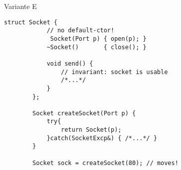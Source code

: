 \begin{frame}[t, fragile]{ Variante E }
	\begin{lstlisting}[basicstyle=\scriptsize]
		struct Socket {
			// no default-ctor!
			 Socket(Port p) { open(p); }
			~Socket()       { close(); }
			
			void send() {
				// invariant: socket is usable
				/*...*/
			}
		};
		
		Socket createSocket(Port p) {
			try{
				return Socket(p);
			}catch(SocketExcp&) { /*...*/ }
		}
		
		Socket sock = createSocket(80);	// moves!
	\end{lstlisting}
\end{frame}

